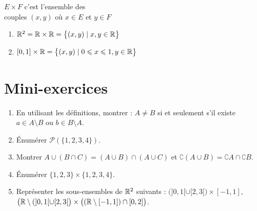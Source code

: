 \begin{frame}

\begin{minipage}{0.7\textwidth}
 $E \times F$ 
c'est l'ensemble des \\ couples $(x,y)$ où $x \in E$ et $y \in F$

\pause
\bigskip

\begin{exemple}
{\small
\begin{enumerate}
  \item $\mathbb{R}^2 = \mathbb{R} \times \mathbb{R}= \big\{ (x,y) \mid x,y \in \mathbb{R} \big\}$

\pause

  \item $[0,1] \times \mathbb{R} = \big\{ (x,y) \mid 0 \leqslant x \leqslant 1, y \in \mathbb{R} \big\}$ 



\end{enumerate}
}
\end{exemple}  
\end{minipage}
\begin{minipage}{0.29\textwidth}
\pause
{}  
\end{minipage}

\end{frame}

\section{Mini-exercices}

\begin{frame}
\begin{miniexercice}
\begin{enumerate}

  \item En utilisant les définitions, montrer : $A \neq B$ si et seulement s'il existe $a \in A \setminus B$
  ou $b \in B \setminus A$.

  \item Énumérer $\mathcal{P}(\{1,2,3,4\})$.

  \item Montrer $A \cup (B \cap C) = (A \cup B) \cap (A \cup C)$ et
$\complement \left( A \cup B \right) = \complement A \cap \complement B$.

  \item Énumérer $\{1,2,3\} \times \{1,2,3,4\}$.

  \item Représenter les sous-ensembles de $\mathbb{R}^2$ suivants :
$\big(]0,1[ \cup [2,3[\big) \times [-1,1]$,
$\big( \mathbb{R} \setminus (]0,1[ \cup [2,3[\big) \times \big( (\mathbb{R} \setminus[-1,1]) \cap [0,2]  \big)$.
\end{enumerate}
\end{miniexercice}
\end{frame}


